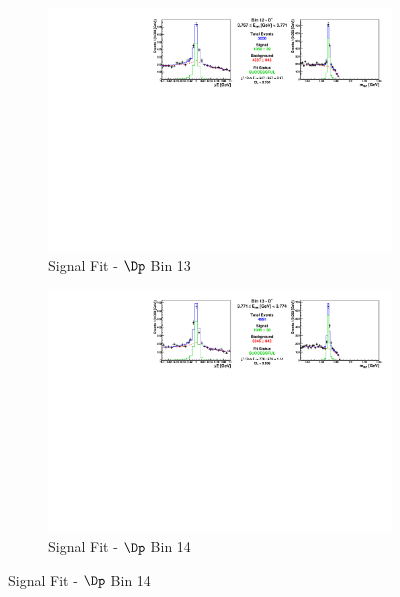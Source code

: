 \begin{figure}[h]

\begin{subfigure}[c]{0.99\textwidth}
\includegraphics[width=\textwidth]{figures/plots/fit_results/Dp_bin_12.pdf}
\caption*{Signal Fit - $\Dp$ Bin 13}
\end{subfigure}

\vspace{5pt}

\begin{subfigure}[c]{0.99\textwidth}
\includegraphics[width=\textwidth]{figures/plots/fit_results/Dp_bin_13.pdf}
\caption*{Signal Fit - $\Dp$ Bin 14}
\end{subfigure}

\vspace{5pt}


\end{figure}
